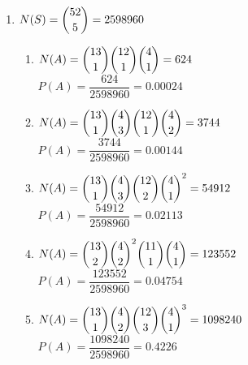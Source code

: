 \documentclass{article}
\begin{document}
\begin{enumerate}
      \item
	$N(S) = \dbinom{52}{5} = 2598960$
	\begin{enumerate}
	 \item 
	    $N(A) = \dbinom{13}{1}\dbinom{12}{1}\dbinom{4}{1} = 624$ \\
	    $P(A) = \dfrac{624}{2598960} = 0.00024$
	 \item 
	    $N(A) = \dbinom{13}{1}\dbinom{4}{3}\dbinom{12}{1}\dbinom{4}{2} = 3744$ \\
	    $P(A) = \dfrac{3744}{2598960} = 0.00144$
	 \item
	    $N(A) = \dbinom{13}{1}\dbinom{4}{3}\dbinom{12}{2}\dbinom{4}{1}^2 = 54912$ \\
	    $P(A) = \dfrac{54912}{2598960} = 0.02113$
	 \item
	    $N(A) = \dbinom{13}{2}\dbinom{4}{2}^2\dbinom{11}{1}\dbinom{4}{1} = 123552$ \\
	    $P(A) = \dfrac{123552}{2598960} = 0.04754$
	 \item
	    $N(A) = \dbinom{13}{1}\dbinom{4}{2}\dbinom{12}{3}\dbinom{4}{1}^3 = 1098240$ \\
	    $P(A) = \dfrac{1098240}{2598960} = 0.4226$
	\end{enumerate}
      \end{enumerate}
      
\end{document}
